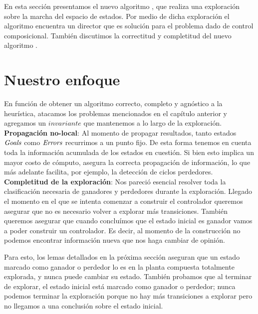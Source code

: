 
En esta sección presentamos el nuevo algoritmo \DCS, que realiza una exploración sobre la marcha del espacio de estados. Por medio de dicha exploración el algoritmo encuentra un director que es solución para el problema dado de control composicional. También discutimos la correctitud y completitud del nuevo algoritmo \DCS. \\

\section{Nuestro enfoque}

En función de obtener un algoritmo correcto, completo y agnóstico a la heurística, atacamos los problemas mencionados en el capítulo anterior y agregamos un $invariante$ que mantenemos a lo largo de la exploración.\\

\textbf{Propagación no-local}: Al momento de propagar resultados, tanto estados $\mathit{Goals}$ como $\mathit{Errors}$ recurrimos a un punto fijo. De esta forma tenemos en cuenta toda la información acumulada de los estados en cuestión. Si bien esto implica un mayor costo de cómputo, asegura la correcta propagación de información, lo que más adelante facilita, por ejemplo, la detección de ciclos perdedores.\\

\textbf{Completitud de la exploración}: Nos pareció esencial resolver toda la clasificación necesaria de ganadores y perdedores durante la exploración. Llegado el momento en el que se intenta comenzar a construir el controlador queremos asegurar que no es necesario volver a explorar más transiciones. También queremos asegurar que cuando concluímos que el estado inicial es ganador vamos a poder construir un controlador. Es decir, al momento de la construcción no podemos encontrar información nueva que nos haga cambiar de opinión.

Para esto, los lemas detallados en la próxima sección aseguran que un estado marcado como ganador o perdedor lo es en la planta compuesta totalmente explorada, y nunca puede cambiar su estado. También probamos que al terminar de explorar, el estado inicial está marcado como ganador o perdedor; nunca podemos terminar la exploración porque no hay más transiciones a explorar pero no llegamos a una conclusión sobre el estado inicial.\\

